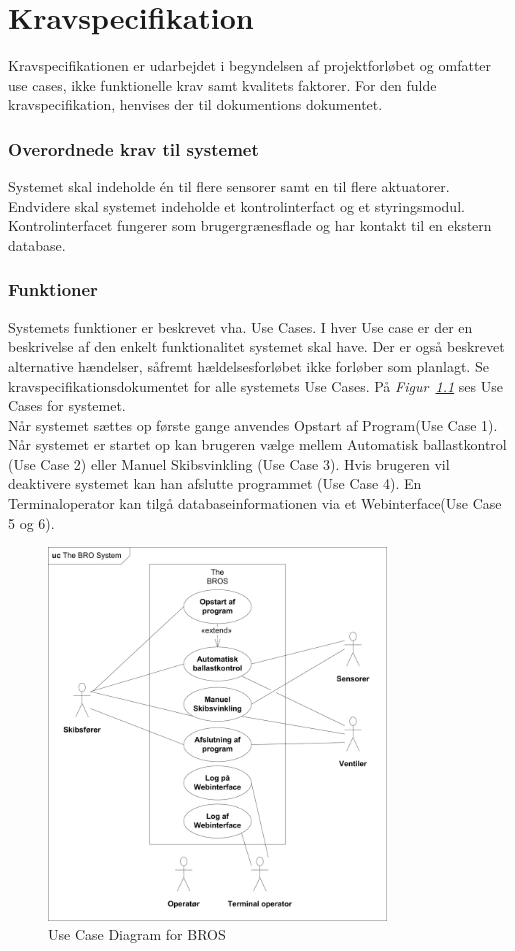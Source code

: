 \chapter{Kravspecifikation}
Kravspecifikationen er udarbejdet i begyndelsen af projektforløbet og omfatter use cases, ikke funktionelle krav samt kvalitets faktorer. For den fulde kravspecifikation, henvises der til dokumentions dokumentet.

\subsection{Overordnede krav til systemet}
Systemet skal indeholde én til flere sensorer samt en til flere aktuatorer. Endvidere skal systemet indeholde et kontrolinterfact og et styringsmodul. Kontrolinterfacet fungerer som brugergrænesflade og har kontakt til en ekstern database.

\subsection{Funktioner}
Systemets funktioner er beskrevet vha. Use Cases. I hver Use case er der en beskrivelse af den enkelt funktionalitet systemet skal have. Der er også beskrevet alternative hændelser, såfremt hældelsesforløbet ikke forløber som planlagt. Se kravspecifikationsdokumentet for alle systemets Use Cases. På \textit{Figur~\ref{fig:UCDBROS}} ses Use Cases for systemet.\\
Når systemet sættes op første gange anvendes Opstart af Program(Use Case 1). Når systemet er startet op kan brugeren vælge mellem Automatisk ballastkontrol (Use Case 2) eller Manuel Skibsvinkling (Use Case 3). Hvis brugeren vil deaktivere systemet kan han afslutte programmet (Use Case 4). En Terminaloperator kan tilgå databaseinformationen via et Webinterface(Use Case 5 og 6).
\begin{figure}[hbpt]
\centering
\includegraphics[width=0.8\textwidth]{billeder/UCDBROS}
\caption{Use Case Diagram for BROS}
\label{fig:UCDBROS}
\end{figure}
